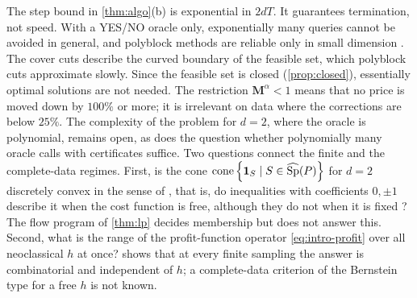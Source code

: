\begin{remark}
The step bound in \cref{thm:algo}(b) is exponential in $2dT$. It guarantees termination, not speed. With a YES/NO oracle only, exponentially many queries cannot be avoided in general, and polyblock methods are reliable only in small dimension \citep{TuyAlKhayyalThach2005}. The cover cuts describe the curved boundary of the feasible set, which polyblock cuts approximate slowly. Since the feasible set is closed (\cref{prop:closed}), essentially optimal solutions \citep{Tuy2005} are not needed. The restriction $\mathbf M^\alpha<1$ means that no price is moved down by $100\%$ or more; it is irrelevant on data where the corrections are below $25\%$. The complexity of the problem for $d=2$, where the oracle is polynomial, remains open, as does the question whether polynomially many oracle calls with certificates suffice. Two questions connect the finite and the complete-data regimes. First, is the cone $\operatorname{cone}\left\{ \mathbf 1_{S}\mid S\in\widehat{\operatorname{Sp}}(P) \right\}$ for $d=2$ discretely convex in the sense of \citet{AgaltsovMolchanovShananin2018}, that is, do inequalities with coefficients $0,\pm1$ describe it when the cost function is free, although they do not when it is fixed \citep{Molchanov2013a}? The flow program of \cref{thm:lp} decides membership but does not answer this. Second, what is the range of the profit-function operator \eqref{eq:intro-profit} over all neoclassical $h$ at once?  shows that at every finite sampling the answer is combinatorial and independent of $h$; a complete-data criterion of the Bernstein type \citep{Agaltsov2015} for a free $h$ is not known.
\end{remark}
